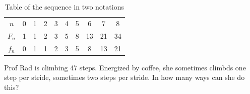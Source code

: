 \documentclass[12pt]{article}
\begin{document}
\begin{table}[htbp]
    \centering
    \caption{Table of the sequence in two notations}
    \begin{tabular}{cccccccccc}
        $n$   & 0& 1& 2& 3& 4& 5& 6& 7& 8\\
        $F_n$ & 1& 1& 2& 3& 5& 8& 13& 21& 34\\
        $f_n$ & 0& 1& 1& 2& 3& 5& 8& 13& 21
    \end{tabular}
\end{table}

\eg Prof Rad is climbing 47 steps. Energized by coffee, she sometimes climbds one step per stride, sometimes two steps per stride. In how many ways can she do this?
\end{document}
